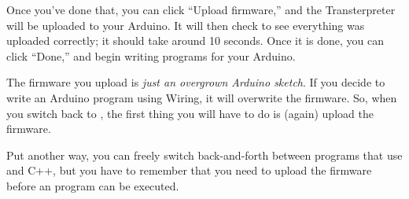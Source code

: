 \newpage

Once you've done that, you can click ``Upload firmware,'' and the Transterpreter will be uploaded to your Arduino. It will then check to see everything was uploaded correctly; it should take around 10 seconds. Once it is done, you can click ``Done,'' and begin writing \occam programs for your Arduino.

\vspace{1cm}
\begin{warning}
The firmware you upload is {\em just an overgrown Arduino sketch}. If you decide to write an Arduino program using Wiring, it will overwrite the \plumbing firmware. So, when you switch back to \occam, the first thing you will have to do is (again) upload the firmware.
\end{warning}
\vspace{1cm}

Put another way, you can freely switch back-and-forth between programs that use \occam and C++, but you have to remember that you need to upload the firmware before an \occam program can be executed.